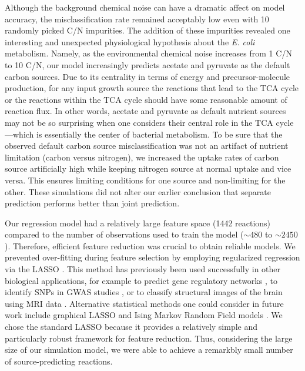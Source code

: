 \documentclass[12pt]{article}
\begin{document}
Although the background chemical noise can have a dramatic affect on model accuracy, the misclassification rate remained acceptably low even with 10 randomly picked C/N impurities. The addition of these impurities revealed one interesting and unexpected physiological hypothesis about the \emph{E. coli} metabolism. Namely, as the environmental chemical noise increases from 1 C/N to 10 C/N, our model increasingly predicts acetate and pyruvate as the default carbon sources. Due to its centrality in terms of energy and precursor-molecule production, for any input growth source the reactions that lead to the TCA cycle or the reactions within the TCA cycle should have some reasonable amount of reaction flux. In other words, acetate and pyruvate as default nutrient sources may not be so surprising when one considers their central role in the TCA cycle---which is essentially the center of bacterial metabolism. To be sure that the observed default carbon source misclassification was not an artifact of nutrient limitation (carbon versus nitrogen), we increased the uptake rates of carbon source artificially high while keeping nitrogen source at normal uptake and vice versa. This ensures limiting conditions for one source and non-limiting for the other. These simulations did not alter our earlier conclusion that separate prediction performs better than joint prediction.

Our regression model had a relatively large feature space (1442 reactions) compared to the number of observations used to train the model ($\mathord{\sim}480$ to $\mathord{\sim}2450$). Therefore, efficient feature reduction was crucial to obtain reliable models. We prevented over-fitting during feature selection by employing regularized regression via the LASSO \cite{Tibshirani1996}. This method has previously been used successfully in other biological applications, for example to predict gene regulatory networks \cite{Menendezetal2010}, to identify SNPs in GWAS studies \cite{Wuetal2009}, or to classify structural images of the brain using MRI data \cite{Casanovaetal2011,Casanovaetal2012,Wangetal2012}. Alternative statistical methods one could consider in future work include graphical LASSO \cite{Friedmanetal2008} and Ising Markov Random Field models \cite{Ravikumaretal2010}. We chose the standard LASSO because it provides a relatively simple and particularly robust framework for feature reduction. Thus, considering the large size of our simulation model, we were able to achieve a remarkbly small number of source-predicting reactions.
\end{document}
